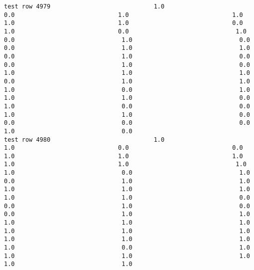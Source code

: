 \documentclass[11pt]{article}
\begin{document}
\begin{verbatim}
test row 4979                             1.0                             0.0                             1.0                             1.0                             1.0                             1.0                             0.0                             1.0                             0.0                              1.0                              0.0                              1.0                              0.0                              0.0                              1.0                              1.0                              0.0                              1.0                              0.0                              0.0                              1.0                              0.0                              1.0                              1.0                              1.0                              0.0                              1.0                              1.0                              1.0                              0.0                              1.0                              1.0                              1.0                              0.0                              1.0                              0.0                              0.0                              1.0                              1.0                              0.0                              0.0                              0.0                              0.0                              1.0                              0.0
test row 4980                             1.0                             1.0                             0.0                             0.0                             1.0                             1.0                             1.0                             1.0                             1.0                              1.0                              1.0                              0.0                              1.0                              0.0                              1.0                              1.0                              1.0                              1.0                              1.0                              1.0                              1.0                              0.0                              0.0                              1.0                              0.0                              0.0                              1.0                              1.0                              1.0                              1.0                              1.0                              1.0                              1.0                              1.0                              1.0                              1.0                              1.0                              1.0                              0.0                              1.0                              1.0                              1.0                              1.0                              1.0                              1.0

\end{verbatim}
\end{document}
